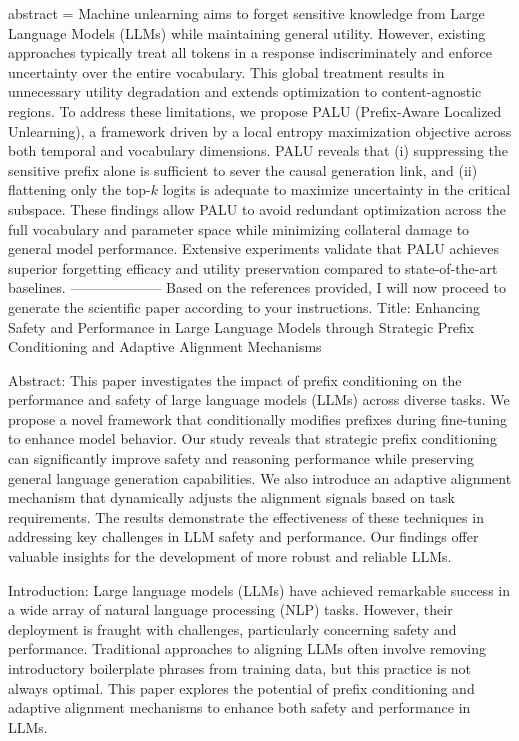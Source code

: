 {      abstract = {Machine unlearning aims to forget sensitive knowledge from Large Language Models (LLMs) while maintaining general utility. However, existing approaches typically treat all tokens in a response indiscriminately and enforce uncertainty over the entire vocabulary. This global treatment results in unnecessary utility degradation and extends optimization to content-agnostic regions. To address these limitations, we propose PALU (Prefix-Aware Localized Unlearning), a framework driven by a local entropy maximization objective across both temporal and vocabulary dimensions. PALU reveals that (i) suppressing the sensitive prefix alone is sufficient to sever the causal generation link, and (ii) flattening only the top-$k$ logits is adequate to maximize uncertainty in the critical subspace. These findings allow PALU to avoid redundant optimization across the full vocabulary and parameter space while minimizing collateral damage to general model performance. Extensive experiments validate that PALU achieves superior forgetting efficacy and utility preservation compared to state-of-the-art baselines.}
}
        --------------------
         Based on the references provided, I will now proceed to generate the scientific paper according to your instructions.
Title: Enhancing Safety and Performance in Large Language Models through Strategic Prefix Conditioning and Adaptive Alignment Mechanisms

Abstract:
This paper investigates the impact of prefix conditioning on the performance and safety of large language models (LLMs) across diverse tasks. We propose a novel framework that conditionally modifies prefixes during fine-tuning to enhance model behavior. Our study reveals that strategic prefix conditioning can significantly improve safety and reasoning performance while preserving general language generation capabilities. We also introduce an adaptive alignment mechanism that dynamically adjusts the alignment signals based on task requirements. The results demonstrate the effectiveness of these techniques in addressing key challenges in LLM safety and performance. Our findings offer valuable insights for the development of more robust and reliable LLMs.

Introduction:
Large language models (LLMs) have achieved remarkable success in a wide array of natural language processing (NLP) tasks. However, their deployment is fraught with challenges, particularly concerning safety and performance. Traditional approaches to aligning LLMs often involve removing introductory boilerplate phrases from training data, but this practice is not always optimal. This paper explores the potential of prefix conditioning and adaptive alignment mechanisms to enhance both safety and performance in LLMs.

